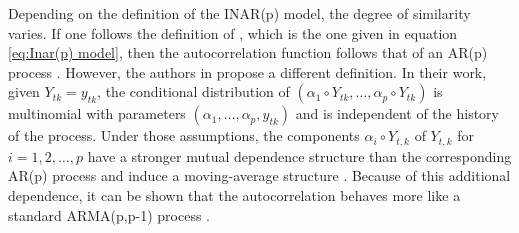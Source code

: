 Depending on the definition of the INAR(p) model, the degree of similarity varies. If one follows the definition of \cite{Guan:1991}, which is the one given in equation \ref{eq:Inar(p) model}, then the autocorrelation function follows that of an AR(p) process \cite{Oliveira:2005}. However, the authors in \cite{Alzaid:1990} propose a different definition. In their work, given $Y_{tk}=y_{tk}$, the conditional distribution of $(\alpha_1 \circ Y_{tk}, \ldots, \alpha_p \circ Y_{tk})$ is multinomial with parameters $( \alpha_1,\ldots,\alpha_p,y_{tk})$ and is independent of the history of the process. Under those assumptions, the components $\alpha_i \circ Y_{t,k}$ of $Y_{t,k}$ for $i=1,2,\ldots,p$  have a stronger mutual dependence structure than the corresponding AR(p) process and induce a moving-average structure \cite{Alzaid:1990}. Because of this additional dependence, it can be shown that the autocorrelation behaves more like a standard ARMA(p,p-1) process \cite{Alzaid:1990}. 